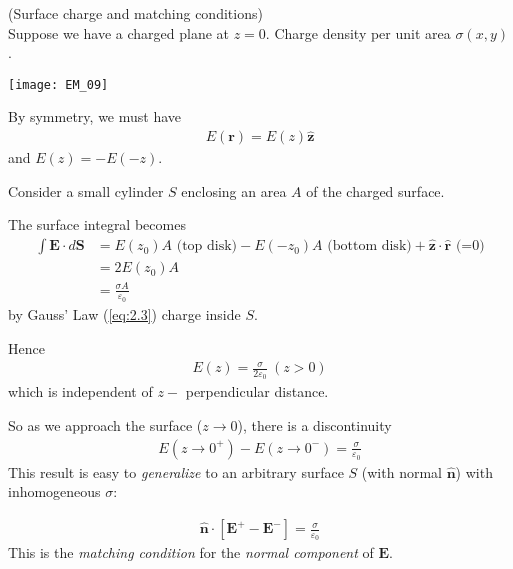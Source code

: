 \documentclass[a4paper]{article}
\begin{document}
\begin{eg} (Surface charge and matching conditions)\\
Suppose we have a charged plane at $z=0$. Charge density per unit area $\sigma(x,y)$. 

\texttt{[image: EM\_09]}

By symmetry, we must have
\begin{equation*}
\begin{aligned}
E(\mathbf{r}) = E(z)\mathbf{\hat{z}}
\end{aligned}
\end{equation*}
and $E(z) =-E(-z)$.

Consider a small cylinder $S$ enclosing an area $A$ of the charged surface.

The surface integral becomes
\begin{equation*}
\begin{aligned}
\int \mathbf{E} \cdot d\mathbf{S} &= E(z_0) A\text{ (top disk)} - E(-z_0) A\text{ (bottom disk)} + \mathbf{\hat{z}} \cdot \mathbf{\hat{r}} \text{ (=0)}\\
&= 2 E(z_0) A\\
&=\frac{\sigma A}{\varepsilon_0}
\end{aligned}
\end{equation*}
by Gauss' Law (\eqref{eq:2.3}) charge inside $S$.

Hence
\begin{equation*}\tag{2.6} \label{eq:2.6}
\begin{aligned}
E(z) = \frac{\sigma}{2 \varepsilon_0} \ (z>0)
\end{aligned}
\end{equation*}
which is independent of $z-$ perpendicular distance.

So as we approach the surface ($z \to 0$), there is a discontinuity
\begin{equation*}\tag{2.7} \label{eq:2.7}
\begin{aligned}
E(z \to 0^+) - E(z \to 0^-) = \frac{\sigma}{\varepsilon_0}
\end{aligned}
\end{equation*}
This result is easy to \emph{generalize} to an arbitrary surface $S$ (with normal $\mathbf{\hat{n}}$) with inhomogeneous $\sigma$:

\begin{equation*}\tag{2.8} \label{eq:2.8}
\begin{aligned}
\mathbf{\hat{n}} \cdot [\mathbf{E}^+ - \mathbf{E}^-] = \frac{\sigma}{\varepsilon_0}
\end{aligned}
\end{equation*}
This is the \emph{matching condition} for the \emph{normal component} of $\mathbf{E}$.


\end{eg}
\end{document}
